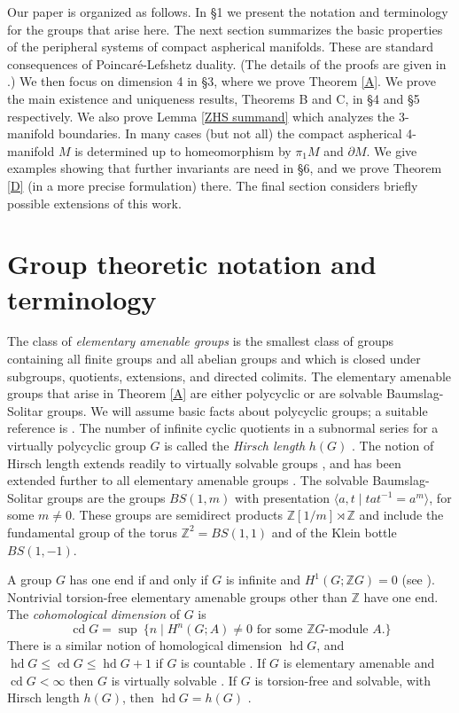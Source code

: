 \documentclass[12pt]{amsart}
\renewcommand{\leq}{\leqslant}
\theoremstyle{definition}
\newcommand{\Z}{\mathbb Z}
\DeclareMathOperator{\cd}{cd}
\DeclareMathOperator{\hd}{hd}
\begin{document}
Our paper is organized as follows.
In \S1 we present the notation and terminology for the groups that arise here.
The next section summarizes the basic properties of the peripheral systems 
of compact aspherical manifolds.
These are standard consequences of Poincar\'e-Lefshetz duality.
(The details of the proofs are given in \cite{dh3}.)
We then focus on dimension 4 in \S3, where we prove Theorem \ref{A}.
We prove the main existence and uniqueness results, Theorems B and C, 
in \S4 and \S5 respectively.  
We also prove Lemma \ref{ZHS summand} which analyzes the 3-manifold boundaries.
In many cases (but not all) the compact aspherical 4-manifold $M$ is determined 
up to homeomorphism by $\pi_1M$ and $\partial{M}$. 
We give examples showing that further invariants are need in \S6,
and we prove Theorem \ref{D} (in a more precise formulation) there.
The  final section considers briefly possible extensions of this work.

\section{Group theoretic notation and terminology}

The class of {\em elementary amenable groups} is the smallest class of groups containing all finite groups and all abelian groups and which is closed under subgroups, quotients, extensions, and directed colimits.  
The elementary amenable groups that arise in Theorem \ref{A} 
are either polycyclic or are solvable Baumslag-Solitar groups. 
We will assume basic facts about polycyclic groups; 
a suitable reference is \cite[Chapter 5]{Ro}.  
The number of infinite cyclic quotients in a subnormal series for a virtually polycyclic group 
$G$ is called the {\em Hirsch length} $h(G)$ \cite[5.4.13]{Ro}.
The notion of Hirsch length extends readily to virtually solvable groups
\cite[page 407]{Ro}, 
and has been extended further to all elementary amenable groups
\cite[\S1.5]{HiF}.
The solvable Baumslag-Solitar groups are the groups $BS(1,m)$
with presentation $\langle{a,t}\mid{tat^{-1}=a^m}\rangle$,
for some $m\not=0$.
These groups are semidirect products $\Z[1/m] \rtimes \Z$ and include the fundamental group of the torus $\mathbb{Z}^2=BS(1,1)$ and of the Klein bottle $BS(1,-1)$. 

A group $G$ has one end if and only if $G$ is infinite and $H^1(G; \Z G) = 0$ (see \cite{DD89}).   
Nontrivial torsion-free elementary amenable groups other than $\Z$ 
have one end.
The {\em cohomological dimension} of $G$ is 
$$
\cd G = \sup~\{n \mid H^n(G; A) \not = 0 \text{ for some $\Z{G}$-module $A$}. \}
$$
There is a similar notion of homological dimension $\hd G$,
and $\hd G\leq\cd G\leq\hd G+1$ if $G$ is countable \cite[4.6]{Bieri}.
If $G$ is elementary amenable and $\cd G<\infty$ then $G$ is virtually solvable \cite{HL92}.
If $G$ is torsion-free and solvable, 
with Hirsch length $h(G)$,
then $\hd G=h(G)$  \cite[7.1]{Bieri}.
\end{document}
